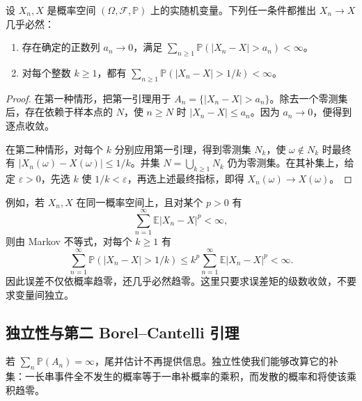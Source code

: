 \begin{corollary}[可求和的误差事件]\label{b1:cor:30-summable-errors}
设 \(X_n,X\) 是概率空间 \((\Omega,\mathcal F,\mathbb P)\) 上的实随机变量。下列任一条件都推出 \(X_n\to X\) 几乎必然：
\begin{enumerate}
 \item 存在确定的正数列 \(a_n\to0\)，满足 \(\sum_{n\geq1}\mathbb P(|X_n-X|>a_n)<\infty\)。
 \item 对每个整数 \(k\geq1\)，都有 \(\sum_{n\geq1}\mathbb P(|X_n-X|>1/k)<\infty\)。
\end{enumerate}
\end{corollary}
\begin{proof}
在第一种情形，把第一引理用于 \(A_n=\{|X_n-X|>a_n\}\)。除去一个零测集后，存在依赖于样本点的 \(N\)，使 \(n\geq N\) 时 \(|X_n-X|\leq a_n\)。因为 \(a_n\to0\)，便得到逐点收敛。

在第二种情形，对每个 \(k\) 分别应用第一引理，得到零测集 \(N_k\)，使 \(\omega\notin N_k\) 时最终有 \(|X_n(\omega)-X(\omega)|\leq1/k\)。并集 \(N=\bigcup_{k\geq1}N_k\) 仍为零测集。在其补集上，给定 \(\varepsilon>0\)，先选 \(k\) 使 \(1/k<\varepsilon\)，再选上述最终指标，即得 \(X_n(\omega)\to X(\omega)\)。
\end{proof}

例如，若 \(X_n,X\) 在同一概率空间上，且对某个 \(p>0\) 有
\[
 \sum_{n=1}^{\infty}\mathbb E|X_n-X|^p<\infty,
\]
则由 Markov 不等式，对每个 \(k\geq1\) 有
\[
 \sum_{n=1}^{\infty}\mathbb P(|X_n-X|>1/k)
 \leq k^p\sum_{n=1}^{\infty}\mathbb E|X_n-X|^p<\infty.
\]
因此误差不仅依概率趋零，还几乎必然趋零。这里只要求误差矩的级数收敛，不要求变量间独立。

\subsection{独立性与第二 Borel–Cantelli 引理}
\label{b1:subsec:300303}

若 \(\sum_n\mathbb P(A_n)=\infty\)，尾并估计不再提供信息。独立性使我们能够改算它的补集：一长串事件全不发生的概率等于一串补概率的乘积，而发散的概率和将使该乘积趋零。

